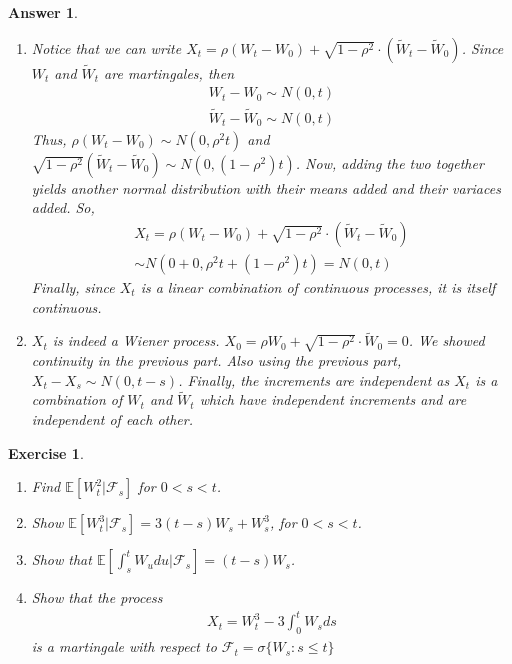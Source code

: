 \documentclass[12pt]{article}
\theoremstyle{colon}
\newtheorem{exercise}{Exercise}
\newtheorem*{answer}{Answer}
\begin{document}
\begin{answer}
  \leavevmode
  \begin{enumerate}[label=\alph*)]
    \item Notice that we can write $X_t = \rho (W_t-W_0) + \sqrt{1 - \rho^2} \cdot (\widetilde{W}_t - \widetilde{W}_0)$. Since $W_t$ and $\widetilde{W}_t$ are martingales, then
    \begin{gather*}
     W_t-W_0 \sim N(0, t) \\
     \widetilde{W}_t - \widetilde{W}_0 \sim N(0, t)
    \end{gather*}
     Thus, $\rho (W_t-W_0) \sim N(0, \rho^2 t)$ and $\sqrt{1 - \rho^2} (\widetilde{W}_t - \widetilde{W}_0) \sim N(0, (1-\rho^2)t)$. Now, adding the two together yields another normal distribution with their means added and their variaces added. So,
     \begin{gather*}
      X_t = \rho (W_t-W_0) + \sqrt{1 - \rho^2} \cdot (\widetilde{W}_t - \widetilde{W}_0) \\
      \sim N(0 + 0, \rho^2 t +(1-\rho^2)t) = N(0, t)
     \end{gather*}
     Finally, since $X_t$ is a linear combination of continuous processes, it is itself continuous.
    \item $X_t$ is indeed a Wiener process. $X_0 = \rho W_0 + \sqrt{1 - \rho^2} \cdot \widetilde{W}_0 = 0$. We showed continuity in the previous part. Also using the previous part, $X_t - X_s \sim N(0, t - s)$. Finally, the increments are independent as $X_t$ is a combination of $W_t$ and $\widetilde{W}_t$ which have independent increments and are independent of each other.
  \end{enumerate}
\end{answer}

\clearpage

\begin{exercise}
  \leavevmode
  \begin{enumerate}[label=\alph*)]
    \item Find $\mathbb{E}[W_t^2 | \mathcal{F}_s]$ for $0 < s < t$.
    \item Show $\mathbb{E}[W_t^3 | \mathcal{F}_s] = 3(t-s)W_s + W_s^3$, for $0 < s < t$.
    \item Show that $\mathbb{E}[\int_s^t W_u du | \mathcal{F}_s] = (t-s)W_s$.
    \item Show that the process
      \begin{gather*}
        X_t = W_t^3 - 3 \int_0^t W_s ds
      \end{gather*}
      is a martingale with respect to $\mathcal{F}_t = \sigma\{ W_s: s \leq t \}$
  \end{enumerate}
\end{exercise}
\end{document}
